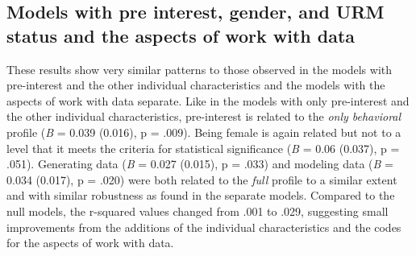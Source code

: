 \documentclass[]{book}
\theoremstyle{definition}
\theoremstyle{definition}
\theoremstyle{definition}
\theoremstyle{remark}
\begin{document}
\begin{landscape}\begin{table}

\caption{\label{tab:reading-for-rq4}Results of mixed effects models with interest and other characteristics}
\centering
{}
\end{table}
\end{landscape}

\subsection{Models with pre interest, gender, and URM status and the
aspects of work with
data}\label{models-with-pre-interest-gender-and-urm-status-and-the-aspects-of-work-with-data}

These results show very similar patterns to those observed in the models
with pre-interest and the other individual characteristics and the
models with the aspects of work with data separate. Like in the models
with only pre-interest and the other individual characteristics,
pre-interest is related to the \emph{only behavioral} profile (\emph{B}
= 0.039 (0.016), p = .009). Being female is again related but not to a
level that it meets the criteria for statistical significance (\emph{B}
= 0.06 (0.037), p = .051). Generating data (\emph{B} = 0.027 (0.015), p
= .033) and modeling data (\emph{B} = 0.034 (0.017), p = .020) were both
related to the \emph{full} profile to a similar extent and with similar
robustness as found in the separate models. Compared to the null models,
the r-squared values changed from .001 to .029, suggesting small
improvements from the additions of the individual characteristics and
the codes for the aspects of work with data.
\end{document}

